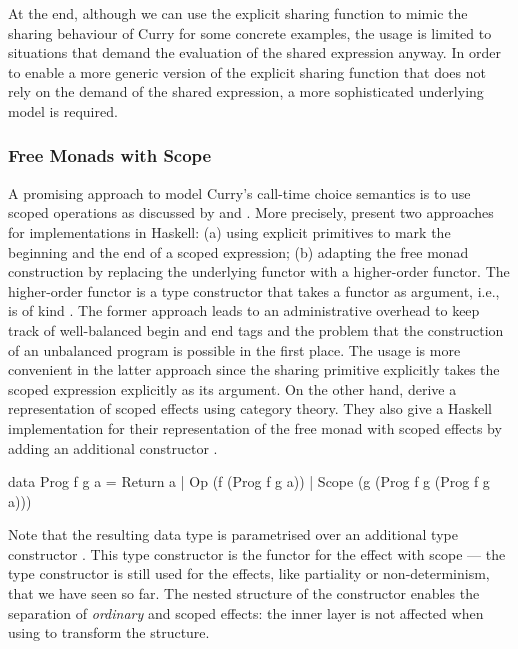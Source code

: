 At the end, although we can use the explicit sharing function  to mimic the sharing behaviour of Curry for some concrete examples, the usage is limited to situations that demand the evaluation of the shared expression anyway.
In order to enable a more generic version of the explicit sharing function that does not rely on the demand of the shared expression, a more sophisticated underlying model is required.

\subsubsection{Free Monads with Scope}

A promising approach to model Curry's call\--time choice semantics is to use scoped operations as discussed by \citet{wu2014effect} and \citet{pirog2018syntax}.
More precisely, \citeauthor{wu2014effect} present two approaches for implementations in Haskell: (a) using explicit primitives to mark the beginning and the end of a scoped expression; (b) adapting the free monad construction by replacing the underlying functor with a higher\--order functor.
The higher\--order functor is a type constructor that takes a functor as argument, i.e., is of kind \hinl{(* -> *) -> * -> *}.
The former approach leads to an administrative overhead to keep track of well\--balanced begin and end tags and the problem that the construction of an unbalanced program is possible in the first place.
The usage is more convenient in the latter approach since the sharing primitive explicitly takes the scoped expression explicitly as its argument.
On the other hand, \citeauthor{pirog2018syntax} derive a representation of scoped effects using category theory.
They also give a Haskell implementation for their representation of the free monad with scoped effects by adding an additional constructor .

\begin{haskellcode}
data Prog f g a = Return a
                | Op (f (Prog f g a))
                | Scope (g (Prog f g (Prog f g a)))
\end{haskellcode}

Note that the resulting data type  is parametrised over an additional type constructor .
This type constructor is the functor for the effect with scope --- the type constructor  is still used for the effects, like partiality or non\--determinism, that we have seen so far.
The nested structure of the  constructor enables the separation of \emph{ordinary} and scoped effects: the inner  layer is not affected when using \hinl{(>>=)} to transform the structure.

